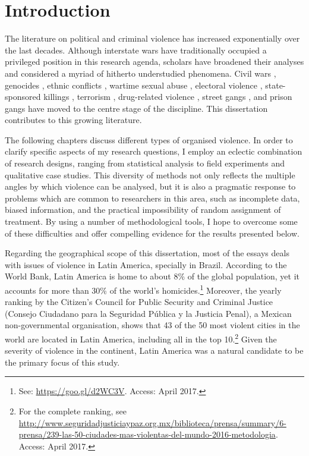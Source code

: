 \chapter{Introduction}
\label{chap:intro}

The literature on political and criminal violence has increased exponentially over the last decades. Although interstate wars have traditionally occupied a privileged position in this research agenda, scholars have broadened their analyses and considered a myriad of hitherto understudied phenomena. Civil wars \citep[][]{collier2004greed,fearon2003ethnicity,kalyvas2006logic}, genocides \citep[][]{mamdani2014victims, power2013problem}, ethnic conflicts \citep[][]{kaufmann1996possible, montalvo2005ethnic, sambanis2001ethnic}, wartime sexual abuse \citep[][]{cohen2013explaining,wood2006variation,wood2009armed}, electoral violence \citep[][]{hoglund2009electoral,wilkinson2006votes}, state-sponsored killings \citep[][]{harff1988toward, krain1997state,krain2005international,uzonyi2014unpacking}, terrorism \citep[][]{de2005quality,bueno2007propaganda,pape2003strategic}, drug-related violence \citep[][]{holmes2006drugs,lessing2015logics,richani2013systems, shirk2010drug}, street gangs \citep[][]{franzese2016youth,jones2009youth,rodgers2006living,sobel1987direct}, and prison gangs \citep[][]{dias2011pulverizaccao,freire2014,skarbek2011governance,skarbek2012prison,skarbek2014social} have moved to the centre stage of the discipline. This dissertation contributes to this growing literature.

The following chapters discuss different types of organised violence. In order to clarify specific aspects of my research questions, I employ an eclectic combination of research designs, ranging from statistical analysis to field experiments and qualitative case studies. This diversity of methods not only reflects the multiple angles by which violence can be analysed, but it is also a pragmatic response to problems which are common to researchers in this area, such as incomplete data, biased information, and the practical impossibility of random assignment of treatment. By using a number of methodological tools, I hope to overcome some of these difficulties and offer compelling evidence for the results presented below.

Regarding the geographical scope of this dissertation, most of the essays deals with issues of violence in Latin America, specially in Brazil. According to the World Bank, Latin America is home to about 8\% of the global population, yet it accounts for more than 30\% of the world's homicides.\footnote{See: \url{https://goo.gl/d2WC3V}. Access: April 2017.} Moreover, the yearly ranking by the Citizen's Council for Public Security and Criminal Justice (Consejo Ciudadano para la Seguridad Pública y la Justicia Penal), a Mexican non-governmental organisation, shows that 43 of the 50 most violent cities in the world are located in Latin America, including all in the top 10.\footnote{For the complete ranking, see \url{http://www.seguridadjusticiaypaz.org.mx/biblioteca/prensa/summary/6-prensa/239-las-50-ciudades-mas-violentas-del-mundo-2016-metodologia}. Access: April 2017.} Given the severity of violence in the continent, Latin America was a natural candidate to be the primary focus of this study.

